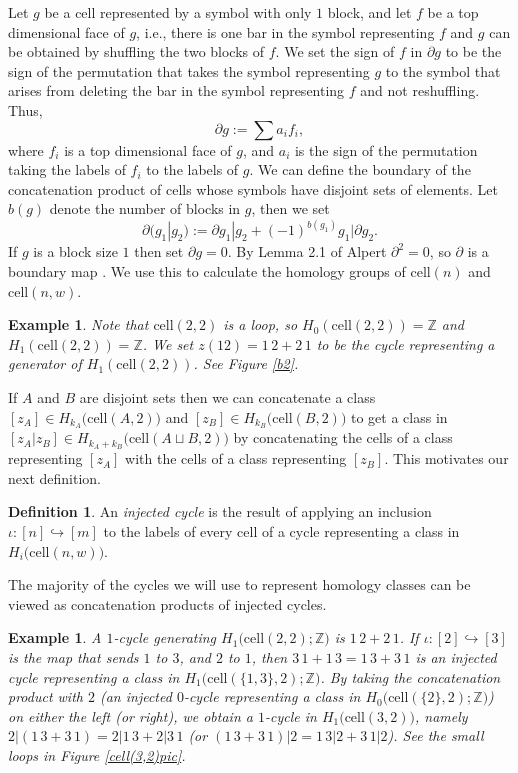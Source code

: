 \documentclass[12py]{amsart}%
\newtheorem{exam}[thm]{Example}
\theoremstyle{definition}\newtheorem{definition}[thm]{Definition}
\theoremstyle{definition}
\newtheorem{defn}[thm]{Definition}
\newcommand{\Z}{\ensuremath{\mathbb{Z}}}
\begin{document}
Let $g$ be a cell represented by a symbol with only $1$ block, and let $f$ be a top dimensional face of $g$, i.e., there is one bar in the symbol representing $f$ and $g$ can be obtained by shuffling the two blocks of $f$. We set the sign of $f$ in $\partial g$ to be the sign of the permutation that takes the symbol representing $g$ to the symbol that arises from deleting the bar in the symbol representing $f$ and not reshuffling. Thus, 
\[
\partial g:=\sum a_{i}f_{i},
\]
where $f_{i}$ is a top dimensional face of $g$, and $a_{i}$ is the sign of the permutation taking the labels of $f_{i}$ to the labels of $g$. We can define the boundary of the concatenation product of cells whose symbols have disjoint sets of elements. Let $b(g)$ denote the number of blocks in $g$, then we set
\[
\partial(g_{1}|g_{2}):=\partial g_{1}|g_{2}+(-1)^{b(g_{1})}g_{1}|\partial g_{2}.
\]
If $g$ is a block size $1$ then set $\partial g=0$. By Lemma 2.1 of Alpert $\partial^{2}=0$, so $\partial$ is a boundary map \cite[Lemma 2.1]{alpert2020generalized}. We use this to calculate the homology groups of $\text{cell}(n)$ and $\text{cell}(n,w)$.

\begin{exam}
Note that $\text{cell}(2,2)$ is a loop, so $H_{0}(\text{cell}(2,2))=\Z$ and $H_{1}(\text{cell}(2,2))=\Z$. We set $z(12)=1\,2+2\,1$ to be the cycle representing a generator of $H_{1}(\text{cell}(2,2))$. See Figure \ref{b2}.
\end{exam}

If $A$ and $B$ are disjoint sets then we can concatenate a class $[z_{A}]\in H_{k_{A}}\big(\text{cell}(A, 2)\big)$ and $[z_{B}]\in H_{k_{B}}\big(\text{cell}(B, 2)\big)$ to get a class in $[z_{A}|z_{B}]\in H_{k_{A}+k_{B}}\big(\text{cell}(A\sqcup B, 2)\big)$ by concatenating the cells of a class representing $[z_{A}]$ with the cells of a class representing $[z_{B}]$. This motivates our next definition.

\begin{defn}
An \emph{injected cycle} is the result of applying an inclusion $\iota:[n]\hookrightarrow[m]$ to the labels of every cell of a cycle representing a class in $H_{i}\big(\text{cell}(n,w)\big)$.
\end{defn}

The majority of the cycles we will use to represent homology classes can be viewed as concatenation products of injected cycles.

\begin{exam}
A $1$-cycle generating $H_{1}\big(\text{cell}(2,2);\Z\big)$ is $1\,2+2\,1$. If $\iota:[2]\hookrightarrow[3]$ is the map that sends $1$ to $3$, and $2$ to $1$, then $3\,1+1\,3=1\,3+3\,1$ is an injected cycle representing a class in $H_{1}\big(\text{cell}(\{1, 3\},2);\Z\big)$. By taking the concatenation product with $2$ (an injected $0$-cycle representing a class in $H_{0}\big(\text{cell}(\{2\},2);\Z\big)$) on either the left (or right), we obtain a $1$-cycle in $H_{1}\big(\text{cell}(3,2)\big)$, namely $2|(1\,3+3\,1)=2|1\,3+2|3\,1$ (or $(1\,3+3\,1)|2=1\,3|2+3\,1|2$). See the small loops in Figure \ref{cell(3,2)pic}.
\end{exam}
\end{document}

